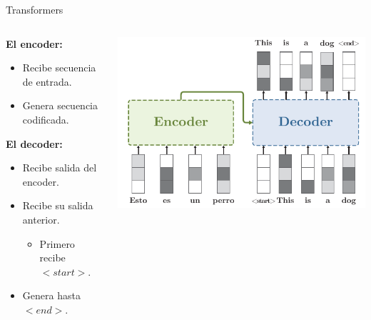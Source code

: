\documentclass[aspectratio=169]{beamer}
\begin{document}
\begin{frame}{Transformers}
  \begin{columns}
    \begin{column}{.4\textwidth}
      \textbf{El encoder:}
      \begin{itemize}
        \item Recibe secuencia de entrada.
        \item Genera secuencia codificada.
      \end{itemize}
      \vspace{.5cm}
      \textbf{El decoder:}
      \begin{itemize}
        \item Recibe salida del encoder.
        \item Recibe su salida anterior.
        \begin{itemize}
          \item Primero recibe \emph{$<start>$}.
        \end{itemize}
        \item Genera hasta \emph{$<end>$}.
      \end{itemize}
    \end{column}
    \begin{column}{.6\textwidth}
      \includegraphics[width=\textwidth, center]{imgs/tema4/att/Transformer_all_s5.pdf}
    \end{column}
  \end{columns}
\end{frame}
\end{document}
